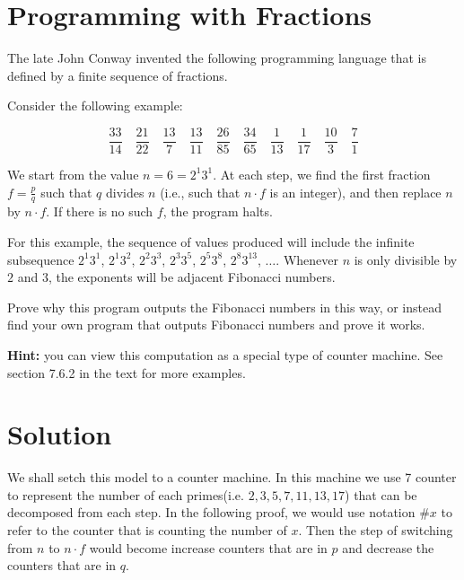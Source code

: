 
\newtheorem{theorem}{Theorem}

\maketitle
\thispagestyle{firststyle}
\vspace{-2.0cm}

\newcommand{\II}{\#2}
\newcommand{\III}{\#3}
\newcommand{\V}{\#5}
\newcommand{\VII}{\#7}
\newcommand{\XI}{\#11}
\newcommand{\XII}{\#13}
\newcommand{\XVII}{\#17}

\section{Programming with Fractions}
    The late John Conway invented the following programming language that is defined by a finite sequence of fractions.
    
    Consider the following example:
    
    \[
    \frac{33}{14} \quad
    \frac{21}{22} \quad
    \frac{13}{7} \quad
    \frac{13}{11} \quad
    \frac{26}{85} \quad
    \frac{34}{65} \quad
    \frac{1}{13} \quad
    \frac{1}{17} \quad
    \frac{10}{3} \quad
    \frac{7}{1}
    \]
    
    We start from the value $n=6=2^1 3^1$. At each step, we find the first fraction $f=\frac{p}{q}$ such that $q$ divides $n$ (i.e., such that $n \cdot f$ is an integer), and then replace $n$ by $n \cdot f$. If there is no such $f$, the program halts.
    
    For this example, the sequence of values produced will include the infinite subsequence $2^1 3^1$, $2^1 3^2$, $2^2 3^3$, $2^3 3^5$, $2^5 3^8$, $2^8 3^{13}$, $\ldots$.
    Whenever $n$ is only divisible by $2$ and $3$, the exponents will be adjacent Fibonacci numbers.
    
    Prove why this program outputs the Fibonacci numbers in this way, or instead find your own program that outputs Fibonacci numbers and prove it works.
    
    \textbf{Hint:} you can view this computation as a special type of counter machine.
    See section 7.6.2 in the text for more examples.

\section*{Solution}

We shall setch this model to a counter machine. 
In this machine we use 7 counter to represent the number of each primes(i.e. $2, 3, 5, 7, 11, 13, 17$) that can be decomposed from each step.
In the following proof, we would use notation $\#x$ to refer to the counter that is counting the number of $x$.
Then the step of switching from $n$ to $n\cdot f$ would become increase counters that are in $p$ and decrease the counters that are in $q$.

